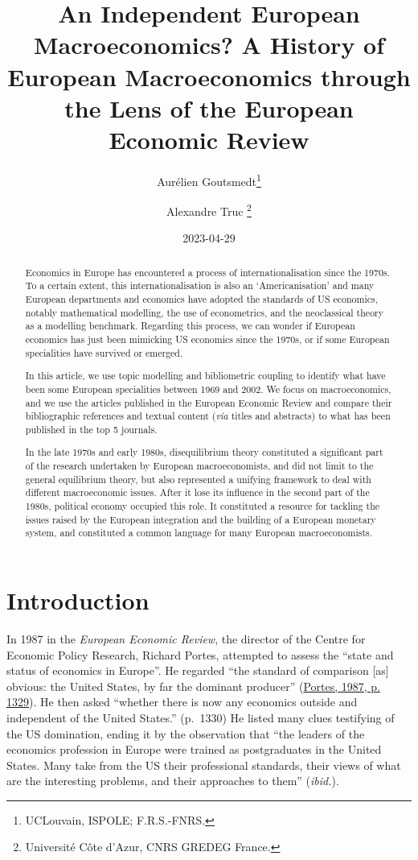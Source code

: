 \documentclass[
  12pt,
  onecolumn]{article}
\title{An Independent European Macroeconomics? A History of European
Macroeconomics through the Lens of the European Economic Review}
\author{Aurélien Goutsmedt\footnote{UCLouvain, ISPOLE; F.R.S.-FNRS.} \and Alexandre
Truc \footnote{Université Côte d'Azur, CNRS GREDEG France.}}
\date{2023-04-29}
\begin{document}
\maketitle
\begin{abstract}
Economics in Europe has encountered a process of internationalisation
since the 1970s. To a certain extent, this internationalisation is also
an `Americanisation' and many European departments and economics have
adopted the standards of US economics, notably mathematical modelling,
the use of econometrics, and the neoclassical theory as a modelling
benchmark. Regarding this process, we can wonder if European economics
has just been mimicking US economics since the 1970s, or if some
European specialities have survived or emerged.

In this article, we use topic modelling and bibliometric coupling to
identify what have been some European specialities between 1969 and
2002. We focus on macroeconomics, and we use the articles published in
the European Economic Review and compare their bibliographic references
and textual content (\emph{via} titles and abstracts) to what has been
published in the top 5 journals.

In the late 1970s and early 1980s, disequilibrium theory constituted a
significant part of the research undertaken by European macroeconomists,
and did not limit to the general equilibrium theory, but also
represented a unifying framework to deal with different macroeconomic
issues. After it lose its influence in the second part of the 1980s,
political economy occupied this role. It constituted a resource for
tackling the issues raised by the European integration and the building
of a European monetary system, and constituted a common language for
many European macroeconomists.
\end{abstract}

\hypertarget{introduction}{%
\section{Introduction}\label{introduction}}

In 1987 in the \emph{European Economic Review}, the director of the
Centre for Economic Policy Research, Richard Portes, attempted to assess
the ``state and status of economics in Europe''. He regarded ``the
standard of comparison {[}as{]} obvious: the United States, by far the
dominant producer'' (\protect\hyperlink{ref-portes1987}{Portes, 1987, p.
1329}). He then asked ``whether there is now any economics outside and
independent of the United States.'' (p.~1330) He listed many clues
testifying of the US domination, ending it by the observation that ``the
leaders of the economics profession in Europe were trained as
postgraduates in the United States. Many take from the US their
professional standards, their views of what are the interesting
problems, and their approaches to them'' (\emph{ibid.}).
\end{document}
